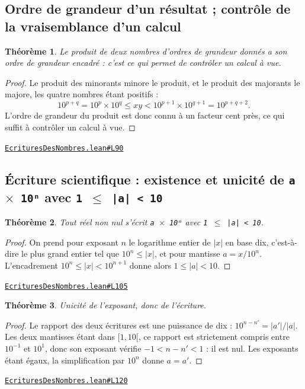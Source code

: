 \documentclass[11pt,a4paper]{article}
\theoremstyle{definition}
\theoremstyle{plain}
\newtheorem{theoreme}{Théorème}
\newcommand{\source}[2]{\par\smallskip\noindent\hfill{\footnotesize\href{#1}{\texttt{#2}}}\par\smallskip}
\begin{document}
\subsection{Ordre de grandeur d'un résultat ; contrôle de la vraisemblance d'un calcul}

\begin{theoreme}
Le produit de deux nombres d'ordres de grandeur donnés a son ordre de grandeur
encadré : c'est ce qui permet de contrôler un calcul à vue.
\end{theoreme}

\begin{proof}
Le produit des minorants minore le produit, et le produit des majorants le majore,
les quatre nombres étant positifs :
\[
10^{p+q} = 10^p \times 10^q \le xy < 10^{p+1} \times 10^{q+1} = 10^{p+q+2} .
\]
L'ordre de grandeur du produit est donc connu à un facteur cent près, ce qui suffit à
contrôler un calcul à vue.
\end{proof}
\source{https://github.com/Commutator-IO/learn-lean/blob/main/courses/01-college/01-nombres-et-calculs/EcrituresDesNombres.lean\#L90}{EcrituresDesNombres.lean\#L90}

\subsection{Écriture scientifique : existence et unicité de \texttt{a \(\times\) 10ⁿ} avec \texttt{1 \(\le\) |a| < 10}}

\begin{theoreme}
Tout réel non nul s'écrit \texttt{a \(\times\) 10ⁿ} avec \texttt{1 \(\le\) |a| < 10}.
\end{theoreme}

\begin{proof}
On prend pour exposant $n$ le logarithme entier de $|x|$ en base dix, c'est-à-dire
le plus grand entier tel que $10^n \le |x|$, et pour mantisse $a = x / 10^n$. L'encadrement
$10^n \le |x| < 10^{n+1}$ donne alors $1 \le |a| < 10$.
\end{proof}
\source{https://github.com/Commutator-IO/learn-lean/blob/main/courses/01-college/01-nombres-et-calculs/EcrituresDesNombres.lean\#L105}{EcrituresDesNombres.lean\#L105}

\begin{theoreme}
Unicité de l'exposant, donc de l'écriture.
\end{theoreme}

\begin{proof}
Le rapport des deux écritures est une puissance de dix : $10^{n-n'} = |a'|/|a|$.
Les deux mantisses étant dans $[1, 10[$, ce rapport est strictement compris entre $10^{-1}$
et $10^{1}$, donc son exposant vérifie $-1 < n - n' < 1$ : il est nul. Les exposants étant
égaux, la simplification par $10^n$ donne $a = a'$.
\end{proof}
\source{https://github.com/Commutator-IO/learn-lean/blob/main/courses/01-college/01-nombres-et-calculs/EcrituresDesNombres.lean\#L120}{EcrituresDesNombres.lean\#L120}
\end{document}
